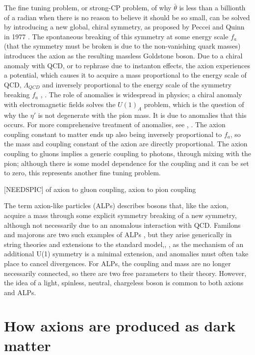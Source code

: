 \documentclass[12pt,twosides]{book}
\begin{document}
 The fine tuning problem, or strong-CP problem, of why $\bar \theta$ is less than a billionth of a radian when there is no reason to believe it should be so small, can be solved by introducing a new global, chiral symmetry, as proposed by Peccei and Quinn in 1977 \cite{peccei77}. The spontaneous breaking of this symmetry at some energy scale $f_a$ (that the symmetry must be broken is due to the non-vanishing quark masses) introduces the axion as the resulting massless Goldstone boson. Due to a chiral anomaly with QCD, or to rephrase due to instanton effects, the axion experiences a potential, which causes it to acquire a mass proportional to the energy scale of QCD, $\Lambda_{QCD}$ and inversely proportional to the energy scale of the symmetry breaking $f_a$ \cite{weinberg78}, \cite{wilczek78}. The role of anomalies is widespread in physics; a chiral anomaly with electromagnetic fields solves the $U(1)_A$ problem, which is the question of why the $\eta'$ is not degenerate with the pion mass. It is due to anomalies that this occurs. For more comprehensive treatment of anomalies, see \cite{bardeen07}, \cite{peskin95}. The axion coupling constant to matter ends up also being inversely proportional to $f_a$, so the mass and coupling constant of the axion are directly proportional. The axion coupling to gluons implies a generic coupling to photons, through mixing with the pion; although there is some model dependence for the coupling and it can be set to zero, this represents another fine tuning problem.

[NEEDSPIC] of axion to gluon coupling, axion to pion coupling

The term axion-like particles (ALPs) describes bosons that, like the axion, acquire a mass through some explicit symmetry breaking of a new symmetry, although not necessarily due to an anomalous interaction with QCD. Familons and majorons are two such examples of ALPs \cite{kim87}, but they arise generically in string theories  and extensions to the standard model,\cite{masso06}, \cite{hewett12}, \cite{arias12} as the mechanism of an additional U(1) symmetry is a minimal extension, and anomalies must often take place to cancel divergences. For ALPs, the coupling and mass are no longer necessarily connected, so there are two free parameters to their theory. However, the idea of a light, spinless, neutral, chargeless boson is common to both axions and ALPs.

\section{How axions are produced as dark matter}
\end{document}
